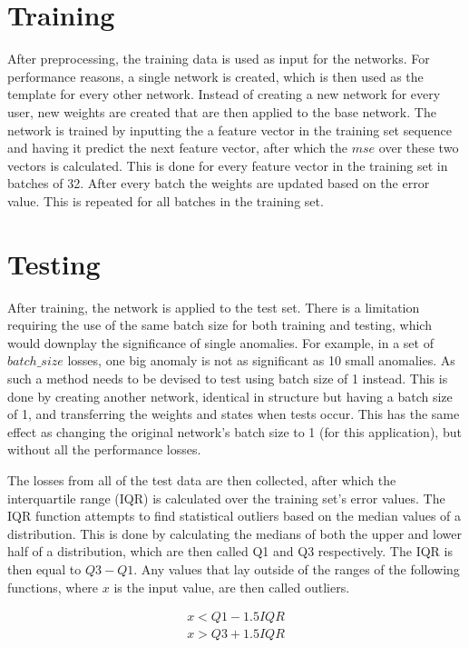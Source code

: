 \section{Training}
After preprocessing, the training data is used as input for the networks. For performance reasons, a single network is created, which is then used as the template for every other network. Instead of creating a new network for every user, new weights are created that are then applied to the base network. The network is trained by inputting the a feature vector in the training set sequence and having it predict the next feature vector, after which the \(mse\) over these two vectors is calculated. This is done for every feature vector in the training set in batches of 32. After every batch the weights are updated based on the error value. This is repeated for all batches in the training set.

\section{Testing}\label{sec:methods:testing}
After training, the network is applied to the test set. There is a limitation requiring the use of the same batch size for both training and testing, which would downplay the significance of single anomalies. For example, in a set of \(batch\_size\) losses, one big anomaly is not as significant as 10 small anomalies. As such a method needs to be devised to test using batch size of 1 instead. This is done by creating another network, identical in structure but having a batch size of 1, and transferring the weights and states when tests occur. This has the same effect as changing the original network's batch size to 1 (for this application), but without all the performance losses.

The losses from all of the test data are then collected, after which the interquartile range (IQR) is calculated over the training set's error values. The IQR function attempts to find statistical outliers based on the median values of a distribution. This is done by calculating the medians of both the upper and lower half of a distribution, which are then called Q1 and Q3 respectively. The IQR is then equal to \(Q3 - Q1\). Any values that lay outside of the ranges of the following functions, where \(x\) is the input value, are then called outliers.

\begin{subequations}
\begin{align}
	x < Q1 - 1.5 IQR \label{eq:iqr_min} \\
	x > Q3 + 1.5 IQR \label{eq:iqr_max}
\end{align}
\end{subequations}

